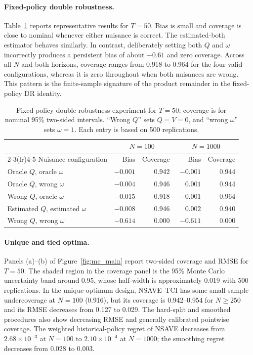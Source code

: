 \documentclass[12pt]{article}
\theoremstyle{remark}\newtheorem{remark}[theorem]{Remark}\theoremstyle{plain}
\begin{document}
\paragraph{Fixed-policy double robustness.}
Table~\ref{tab:mc_dr} reports representative results for $T=50$.  Bias is
small and coverage is close to nominal whenever either nuisance is correct.
The estimated-both estimator behaves similarly.  In contrast, deliberately
setting both $Q$ and $\omega$ incorrectly produces a persistent bias of about
$-0.61$ and zero coverage.  Across all $N$ and both horizons, coverage ranges
from 0.918 to 0.964 for the four valid configurations, whereas it is zero
throughout when both nuisances are wrong.  This pattern is the finite-sample
signature of the product remainder in the fixed-policy DR identity.

\begin{table}[htbp]
\centering
\caption{Fixed-policy double-robustness experiment for $T=50$; coverage is
for nominal 95\% two-sided intervals.  ``Wrong
$Q$'' sets $Q=V=0$, and ``wrong $\omega$'' sets $\omega=1$.  Each entry is
based on 500 replications.}
\label{tab:mc_dr}
\begin{tabular}{lrrrr}
\toprule
& \multicolumn{2}{c}{$N=100$} & \multicolumn{2}{c}{$N=1000$} \\
\cmidrule(lr){2-3}\cmidrule(lr){4-5}
Nuisance configuration & Bias & Coverage & Bias & Coverage \\
\midrule
Oracle $Q$, oracle $\omega$       & $-0.001$ & 0.942 & $-0.001$ & 0.944 \\
Oracle $Q$, wrong $\omega$        & $-0.004$ & 0.946 & $\phantom{-}0.001$ & 0.944 \\
Wrong $Q$, oracle $\omega$        & $-0.015$ & 0.918 & $-0.001$ & 0.964 \\
Estimated $Q$, estimated $\omega$ & $-0.008$ & 0.946 & $\phantom{-}0.002$ & 0.940 \\
Wrong $Q$, wrong $\omega$         & $-0.614$ & 0.000 & $-0.611$ & 0.000 \\
\bottomrule
\end{tabular}
\end{table}

\paragraph{Unique and tied optima.}
Panels (a)--(b) of Figure~\ref{fig:mc_main} report two-sided coverage and RMSE for $T=50$.
The shaded region in the coverage panel is the 95\% Monte Carlo uncertainty
band around 0.95, whose half-width is approximately 0.019 with 500
replications.  In the unique-optimum design, NSAVE--TCI has some
small-sample undercoverage at $N=100$ (0.916), but its coverage is
0.942--0.954 for $N\geq250$ and its RMSE decreases from 0.127 to 0.029.
The hard-split and smoothed procedures also show decreasing RMSE and
generally calibrated pointwise coverage.  The weighted historical-policy
regret of NSAVE decreases from $2.68\times10^{-3}$ at $N=100$ to
$2.10\times10^{-4}$ at $N=1000$; the smoothing regret decreases from 0.028
to 0.003.
\end{document}
